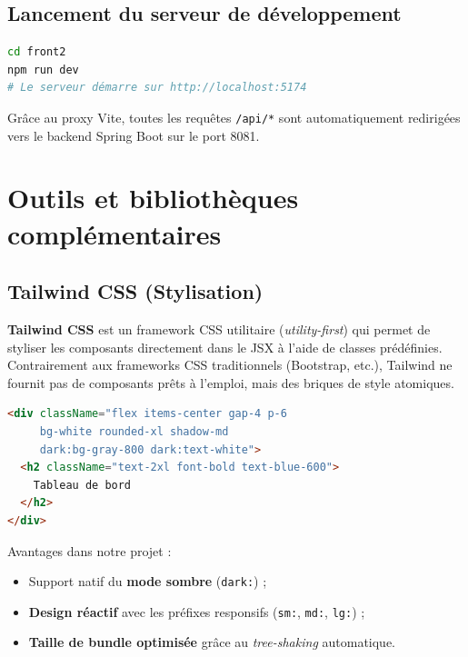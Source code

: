 \subsection{Lancement du serveur de développement}

\begin{lstlisting}[language=bash,caption={Démarrage du frontend}]
cd front2
npm run dev
# Le serveur démarre sur http://localhost:5174
\end{lstlisting}

Grâce au proxy Vite, toutes les requêtes \texttt{/api/*} sont automatiquement redirigées vers le backend Spring Boot sur le port 8081.

\section{Outils et bibliothèques complémentaires}

\subsection{Tailwind CSS (Stylisation)}

\textbf{Tailwind CSS} est un framework CSS utilitaire (\textit{utility-first}) qui permet de styliser les composants directement dans le JSX à l'aide de classes prédéfinies. Contrairement aux frameworks CSS traditionnels (Bootstrap, etc.), Tailwind ne fournit pas de composants prêts à l'emploi, mais des briques de style atomiques.

\begin{lstlisting}[language=HTML,caption={Exemple d'utilisation de Tailwind CSS}]
<div className="flex items-center gap-4 p-6
     bg-white rounded-xl shadow-md
     dark:bg-gray-800 dark:text-white">
  <h2 className="text-2xl font-bold text-blue-600">
    Tableau de bord
  </h2>
</div>
\end{lstlisting}

Avantages dans notre projet :
\begin{itemize}[noitemsep]
    \item Support natif du \textbf{mode sombre} (\texttt{dark:}) ;
    \item \textbf{Design réactif} avec les préfixes responsifs (\texttt{sm:}, \texttt{md:}, \texttt{lg:}) ;
    \item \textbf{Taille de bundle optimisée} grâce au \textit{tree-shaking} automatique.
\end{itemize}

